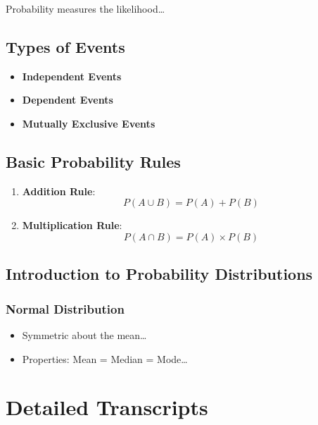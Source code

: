 \documentclass[
  letterpaper,
  DIV=11,
  numbers=noendperiod]{scrreprt}
\providecommand{\tightlist}{%
  \setlength{\itemsep}{0pt}\setlength{\parskip}{0pt}}
\begin{document}
Probability measures the likelihood\ldots{}

\section{Types of Events}\label{types-of-events}

\begin{itemize}
\tightlist
\item
  \textbf{Independent Events}
\item
  \textbf{Dependent Events}
\item
  \textbf{Mutually Exclusive Events}
\end{itemize}

\section{Basic Probability Rules}\label{basic-probability-rules}

\begin{enumerate}
\def\labelenumi{\arabic{enumi}.}
\tightlist
\item
  \textbf{Addition Rule}: \[
  P(A \cup B) = P(A) + P(B)
  \]
\item
  \textbf{Multiplication Rule}: \[
  P(A \cap B) = P(A) \times P(B)
  \]
\end{enumerate}

\section{Introduction to Probability
Distributions}\label{introduction-to-probability-distributions}

\subsection{Normal Distribution}\label{normal-distribution}

\begin{itemize}
\tightlist
\item
  Symmetric about the mean\ldots{}
\item
  Properties: Mean = Median = Mode\ldots{}
\end{itemize}


\chapter{Detailed Transcripts}\label{detailed-transcripts}
\end{document}
